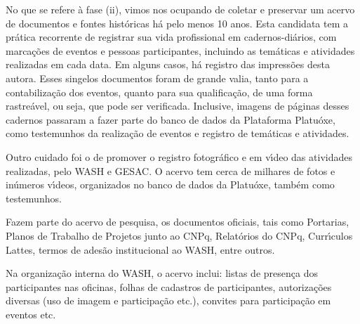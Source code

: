\documentclass[
12pt,		%
openright,	%
twoside,  %
a4paper,			%
chapter=TITLE,		%
english,			%
french,				%
spanish,			%
brazil				%
]{USPSC-classe/USPSC}
\begin{document}
No que se refere \`a fase (ii), vimos nos ocupando de coletar e preservar um acervo de documentos e fontes hist\'oricas h\'a pelo menos 10 anos. Esta candidata tem a pr\'atica recorrente de registrar sua vida profissional em cadernos-di\'arios, com marca\c{c}\~oes de eventos e pessoas participantes, incluindo as tem\'aticas e atividades realizadas em cada data. Em alguns casos, h\'a registro das impress\~oes desta autora. Esses singelos documentos foram de grande valia, tanto para a contabiliza\c{c}\~ao dos eventos, quanto para sua qualifica\c{c}\~ao, de uma forma rastre\'avel, ou seja, que pode ser verificada. Inclusive, imagens de p\'aginas desses cadernos passaram a fazer parte do banco de dados da Plataforma Platu\'oxe, como testemunhos da realiza\c{c}\~ao de eventos e registro de tem\'aticas e atividades.

















Outro cuidado foi o de promover o registro fotogr\'afico e em v\'{\i}deo das atividades realizadas, pelo WASH e GESAC. O acervo tem cerca de milhares de fotos e in\'umeros v\'{\i}deos, organizados no banco de dados da Platu\'oxe, tamb\'em como testemunhos.

















Fazem parte do acervo de pesquisa, os documentos oficiais, tais como Portarias, Planos de Trabalho de Projetos junto ao CNPq, Relat\'orios do CNPq, Curr\'{\i}culos Lattes, termos de ades\~ao institucional ao WASH, entre outros.

















Na organiza\c{c}\~ao interna do WASH, o acervo inclui: listas de presen\c{c}a dos participantes nas oficinas, folhas de cadastros de participantes, autoriza\c{c}\~oes diversas (uso de imagem e participa\c{c}\~ao etc.), convites   para participa\c{c}\~ao em eventos etc.
\end{document}
